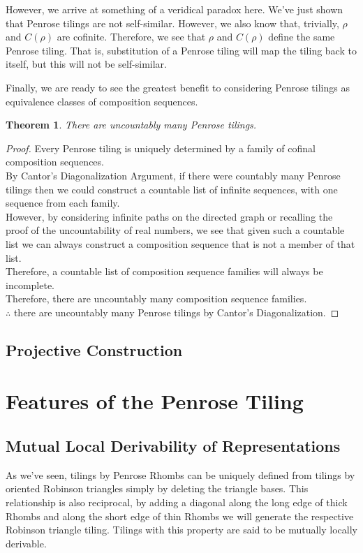 \documentclass[
  oneside,
  11pt, a4paper,
  footinclude=true,
  headinclude=true,
  cleardoublepage=empty
]{scrbook}
\newtheorem{mythm}{Theorem}
\begin{document}
However, we arrive at something of a veridical paradox here. We've just shown that Penrose tilings are not self-similar. However, we also know that, trivially, $\rho$ and $C(\rho)$ are cofinite. Therefore, we see that $\rho$ and $C(\rho)$ define the same Penrose tiling. That is, substitution of a Penrose tiling will map the tiling back to itself, but this will not be self-similar. 

Finally, we are ready to see the greatest benefit to considering Penrose tilings as equivalence classes of composition sequences.

\begin{mythm}
There are uncountably many Penrose tilings.
\end{mythm}

\begin{proof}
Every Penrose tiling is uniquely determined by a family of cofinal composition sequences.\\
By Cantor's Diagonalization Argument, if there were countably many Penrose tilings then we could construct a countable list of infinite sequences, with one sequence from each family.\\
However, by considering infinite paths on the directed graph or recalling the proof of the uncountability of real numbers, we see that given such a countable list we can always construct a composition sequence that is not a member of that list.\\
Therefore, a countable list of composition sequence families will always be incomplete.\\
Therefore, there are uncountably many composition sequence families.\\
$\therefore$ there are uncountably many Penrose tilings by Cantor's Diagonalization.
\end{proof}

\section{Projective Construction}


\chapter{Features of the Penrose Tiling}

\section{Mutual Local Derivability of Representations} %
As we've seen, tilings by Penrose Rhombs can be uniquely defined from tilings by oriented Robinson triangles simply by deleting the triangle bases. This relationship is also reciprocal, by adding a diagonal along the long edge of thick Rhombs and along the short edge of thin Rhombs we will generate the respective Robinson triangle tiling. Tilings with this property are said to be mutually locally derivable.
\end{document}
